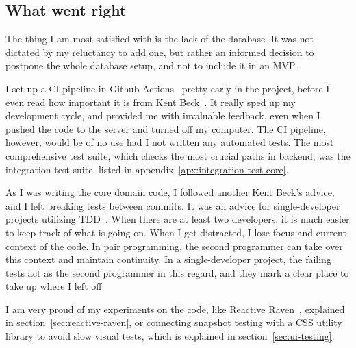 \subsection{What went right}\label{sec:what-went-right}

The thing I am most satisfied with
is the lack of the database.
It was not dictated by my reluctancy to add one,
but rather an informed decision
to postpone the whole database setup,
and not to include it in an \ac{MVP}.

I set up a \ac{CI} pipeline
in Github Actions~\cite{github_inc_github_2022-1}
pretty early in the project,
before I even read how important it is
from Kent Beck~\cite{beck_extreme_2004}.
It really sped up my development cycle,
and provided me with invaluable feedback,
even when I pushed the code to the server
and turned off my computer.
The \ac{CI} pipeline, however,
would be of no use had I not written
any automated tests.
The most comprehensive test suite,
which checks the most crucial paths
in backend,
was the integration test suite,
listed in appendix~\ref{apx:integration-test-core}.

As I was writing the core domain code,
I followed another Kent Beck's advice,
and I left breaking tests between commits.
It was an advice for single-developer projects
utilizing \ac{TDD}~\cite{beck_test-driven_2002}.
When there are at least two developers,
it is much easier to keep track of what is going on.
When I get distracted,
I lose focus and current context of the code.
In pair programming,
the second programmer can take over this context
and maintain continuity.
In a single-developer project,
the failing tests act as the second programmer
in this regard,
and they mark a clear place
to take up where I left off.

I am very proud of my experiments
on the code,
like Reactive Raven~\cite{sewera_reactive_2022},
explained in section~\ref{sec:reactive-raven},
or connecting snapshot testing
with a \ac{CSS} utility library
to avoid slow visual tests,
which is explained in section~\ref{sec:ui-testing}.

